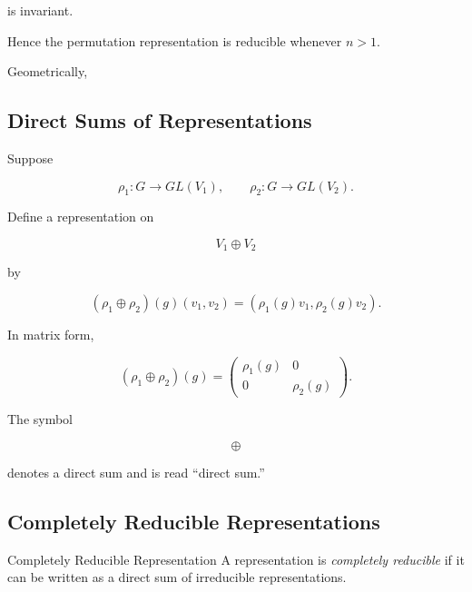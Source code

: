 is invariant.

Hence the permutation representation is reducible whenever \(n>1\).

Geometrically,

\begin{center}
\end{center}

\subsection{Direct Sums of Representations}
\label{subsec:direct-sum-representations}

Suppose

\[ \rho_1:G\to GL(V_1),\qquad \rho_2:G\to GL(V_2). \]

Define a representation on

\[ V_1\oplus V_2 \]

by

\[ (\rho_1\oplus\rho_2)(g)(v_1,v_2)
=(\rho_1(g)v_1,\rho_2(g)v_2). \]

In matrix form,

\[ (\rho_1\oplus\rho_2)(g)=
\begin{pmatrix}
\rho_1(g)&0\\
0&\rho_2(g)
\end{pmatrix}. \]

The symbol

\[ \oplus \]

denotes a direct sum and is read ``direct sum.''

\subsection{Completely Reducible Representations}
\label{subsec:completely-reducible}

\begin{definitionbox}{Completely Reducible Representation}
A representation is \emph{completely reducible} if it can be written as a
direct sum of irreducible representations.
\end{definitionbox}


